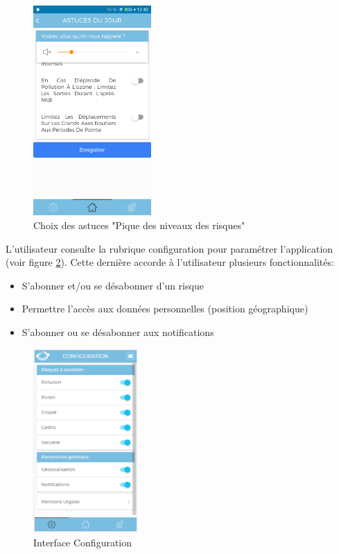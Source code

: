 \begin{figure}[!h]
	\begin{center}
		\includegraphics[height=8cm]{figures/rappel_trick}
	\end{center}
	\caption{Choix des astuces "Pique des niveaux des risques"}
	\label{fig4.9}
\end{figure}

 L'utilisateur consulte la rubrique configuration pour paramétrer l'application (voir figure \ref{fig4.10}). Cette dernière accorde à l'utilisateur plusieurs fonctionnalités: 
\begin{itemize}
	\item S'abonner et/ou se désabonner d'un risque
	\item Permettre l'accès aux données personnelles (position géographique)
	\item S'abonner ou se désabonner aux notifications
\end{itemize} 

\begin{figure}[!h]
	\begin{center}
		\includegraphics[height=7cm]{figures/subscribe}
	\end{center}
	\caption{Interface Configuration}
	\label{fig4.10}
\end{figure}

